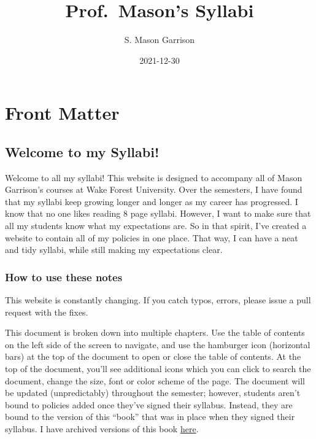\documentclass[
]{book}
\title{Prof.~Mason's Syllabi}
\author{S. Mason Garrison}
\date{2021-12-30}
\begin{document}
\maketitle

{
\setcounter{tocdepth}{0}
\tableofcontents
}
\hypertarget{part-front-matter}{%
\part*{Front Matter}\label{part-front-matter}}

\hypertarget{welcome-to-my-syllabi}{%
\chapter*{Welcome to my Syllabi!}\label{welcome-to-my-syllabi}}

Welcome to all my syllabi! This website is designed to accompany all of Mason Garrison's courses at Wake Forest University.
Over the semesters, I have found that my syllabi keep growing longer and longer as my career has progressed.
I know that no one likes reading 8 page syllabi.
However, I want to make sure that all my students know what my expectations are.
So in that spirit, I've created a website to contain all of my policies in one place.
That way, I can have a neat and tidy syllabi, while still making my expectations clear.

\hypertarget{how-to-use-these-notes}{%
\section*{How to use these notes}\label{how-to-use-these-notes}}

This website is constantly changing. If you catch typos, errors, please issue a pull request with the fixes.

This document is broken down into multiple chapters. Use the table of contents on the left side of the screen to navigate, and use the hamburger icon (horizontal bars) at the top of the document to open or close the table of contents. At the top of the document, you'll see additional icons which you can click to search the document, change the size, font or color scheme of the page. The document will be updated (unpredictably) throughout the semester; however, students aren't bound to policies added once they've signed their syllabus. Instead, they are bound to the version of this ``book'' that was in place when they signed their syllabus. I have archived versions of this book \href{https://github.com/smasongarrison/syllabi/tree/main/Previous\%20Semesters}{here}.
\end{document}
